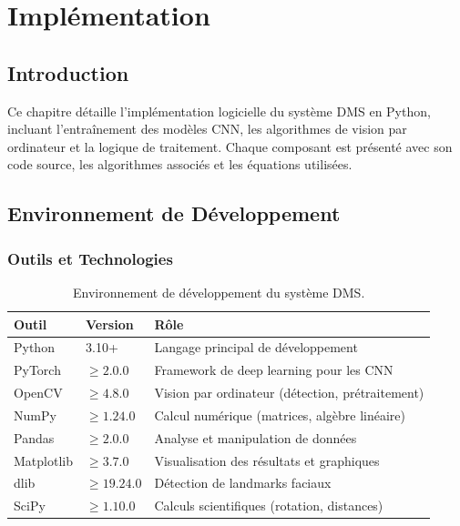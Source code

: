 
\chapter{Implémentation}

\section{Introduction}

Ce chapitre détaille l'implémentation logicielle du système DMS en Python, incluant l'entraînement des modèles CNN, les algorithmes de vision par ordinateur et la logique de traitement. Chaque composant est présenté avec son code source, les algorithmes associés et les équations utilisées.

\section{Environnement de Développement}

\subsection{Outils et Technologies}

\begin{table}[H]
\centering
\caption{Environnement de développement du système DMS.}
\label{tab:dev_env}
\renewcommand{\arraystretch}{1.3}
\begin{tabularx}{\textwidth}{|l|l|X|}
\hline
\rowcolor{stellantisblue!15}
\textbf{Outil} & \textbf{Version} & \textbf{Rôle} \\
\hline
Python & 3.10+ & Langage principal de développement \\
\hline
PyTorch & $\geq 2.0.0$ & Framework de deep learning pour les CNN \\
\hline
OpenCV & $\geq 4.8.0$ & Vision par ordinateur (détection, prétraitement) \\
\hline
NumPy & $\geq 1.24.0$ & Calcul numérique (matrices, algèbre linéaire) \\
\hline
Pandas & $\geq 2.0.0$ & Analyse et manipulation de données \\
\hline
Matplotlib & $\geq 3.7.0$ & Visualisation des résultats et graphiques \\
\hline
dlib & $\geq 19.24.0$ & Détection de landmarks faciaux \\
\hline
SciPy & $\geq 1.10.0$ & Calculs scientifiques (rotation, distances) \\
\hline
\end{tabularx}
\end{table}

